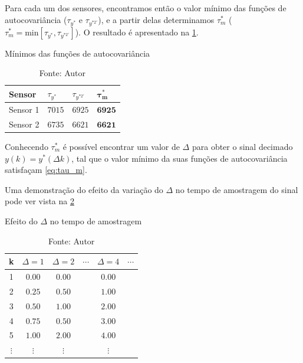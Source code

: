 \begin{apendicesenv}
Para cada um dos sensores, encontramos então o valor mínimo das funções de autocovariância
($\tau_{y^{*}}$ e $\tau_{y^{*2'}}$), e a partir delas determinamos $\tau_m^*$
($\tau_{m}^{*} = \mathrm{min} \left[ \tau_{y^*} , \tau_{y^{*2'}} \right]$).
O resultado é apresentado na \cref{tab:tau_s1s2}.

\begin{table}[h]
	\centering
	\caption{Mínimos das funções de autocovariância}
	\label{tab:tau_s1s2}
	\begin{tabular}{llll} \toprule
		{Sensor}		& {$\tau_{y^{*}}$}		& {$\tau_{y^{*2'}}$}		& {$\pmb{\tau}_{\pmb{m}}^{\pmb{*}}$}		\\ \midrule
		Sensor 1		& $7015$				& $6925$					& $\pmb{6}\pmb{9}\pmb{2}\pmb{5}$			\\
		Sensor 2		& $6735$				& $6621$					& $\pmb{6}\pmb{6}\pmb{2}\pmb{1}$			\\ \bottomrule
	\end{tabular}
	\caption*{Fonte: Autor}
\end{table}

Conhecendo $\tau_{m}^{*}$ é possível encontrar um valor de $\Delta$ para obter o sinal decimado
$y(k) = y^*(\Delta k)$, tal que o valor mínimo da suas funções de autocovariância satisfaçam
\cref{eq:tau_m}.

Uma demonstração do efeito da variação do $\Delta$ no tempo de amostragem do sinal
pode ver vista na \cref{tab:delta_action}

\begin{table}[h]
	\centering
	\caption{Efeito do $\Delta$ no tempo de amostragem}
	\label{tab:delta_action}
	\begin{tabular}{cccccc} \toprule
		{k}			& {$\Delta=1$}		& {$\Delta=2$}		& {$\cdots$}	& {$\Delta=4$}	& {$\cdots$} 	\\ \midrule
		1			& $0.00$			& $0.00$			& \hfill		& $0.00$		& \hfill		\\
		2			& $0.25$			& $0.50$			& \hfill		& $1.00$		& \hfill		\\
		3			& $0.50$			& $1.00$			& \hfill		& $2.00$		& \hfill		\\
		4			& $0.75$			& $0.50$			& \hfill		& $3.00$		& \hfill		\\
		5			& $1.00$			& $2.00$			& \hfill		& $4.00$		& \hfill		\\ 
		$\vdots$	& $\vdots$			& $\vdots$			& \hfill		& $\vdots$		& \hfill		\\ \bottomrule 
	\end{tabular}
	\caption*{Fonte: Autor}
\end{table}


\end{apendicesenv}
